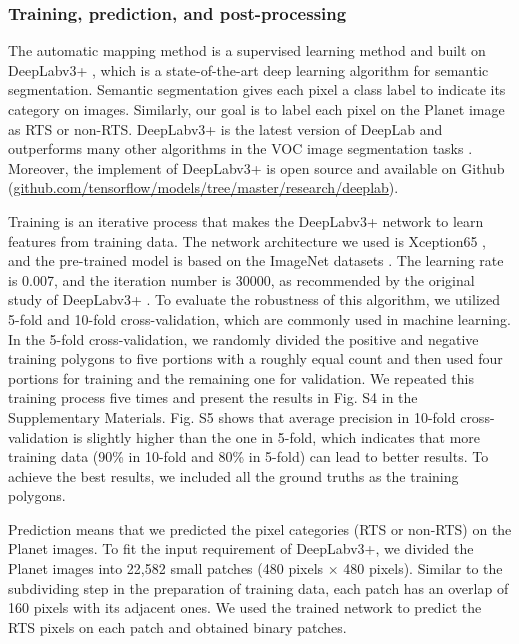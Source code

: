 \documentclass[preprint,12pt,authoryear]{elsarticle}
\begin{document}
\subsubsection{Training, prediction, and post-processing}
\label{subsubsec_deeplab}

The automatic mapping method is a supervised learning method and built on DeepLabv3+ \citep{chen_encoder-decoder_2018}, which is a state-of-the-art deep learning algorithm for semantic segmentation. Semantic segmentation gives each pixel a class label to indicate its category on images. Similarly, our goal is to label each pixel on the Planet image as RTS or non-RTS. DeepLabv3+ is the latest version of DeepLab and outperforms many other algorithms in the VOC image segmentation tasks \citep{everingham_pascal_2015}. Moreover, the implement of DeepLabv3+ is open source and available on Github (\url{github.com/tensorflow/models/tree/master/research/deeplab}).

Training is an iterative process that makes the DeepLabv3+ network to learn features from training data. The network architecture we used is Xception65 \citep{chollet2017xception}, and the pre-trained model is based on the ImageNet datasets \citep{russakovsky2015imagenet}. The learning rate is 0.007, and the iteration number is 30000, as recommended by the original study of DeepLabv3+ \citep{chen_encoder-decoder_2018}. To evaluate the robustness of this algorithm, we utilized 5-fold and 10-fold cross-validation, which are commonly used in machine learning. In the 5-fold cross-validation, we randomly divided the positive and negative training polygons to five portions with a roughly equal count and then used four portions for training and the remaining one for validation. We repeated this training process five times and present the results in Fig. S4 in the Supplementary Materials. Fig. S5 shows that average precision in 10-fold cross-validation is slightly higher than the one in 5-fold, which indicates that more training data (90\% in 10-fold and 80\% in 5-fold) can lead to better results. To achieve the best results, we included all the ground truths as the training polygons. 

Prediction means that we predicted the pixel categories (RTS or non-RTS) on the Planet images. To fit the input requirement of DeepLabv3+, we divided the Planet images into 22,582 small patches (480 pixels $\times$ 480 pixels). Similar to the subdividing step in the preparation of training data, each patch has an overlap of 160 pixels with its adjacent ones. We used the trained network to predict the RTS pixels on each patch and obtained binary patches. 
\end{document}
